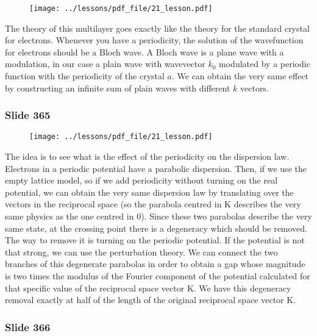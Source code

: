 \documentclass[../main/main.tex]{subfiles}
\begin{document}
\begin{figure}[h!]
\centering
\texttt{[image: ../lessons/pdf\_file/21\_lesson.pdf]}
\end{figure}

The theory of this multilayer goes exactly like the theory for the standard crystal for electrons. 
Whenever you have a periodicity, the solution of the wavefunction for electrons should be a Bloch wave. 
A Bloch wave is a plane wave with a modulation, in our case a plain wave with wavevector $k_0$ modulated by a periodic function with the periodicity of the crystal $a$. 
We can obtain the very same effect by constructing an infinite sum of plain waves with different $k$ vectors.


\newpage

\subsubsection{Slide 365}

\begin{figure}[h!]
\centering
\texttt{[image: ../lessons/pdf\_file/21\_lesson.pdf]}
\end{figure}

The idea is to see what is the effect of the periodicity on the dispersion law.
Electrons in a periodic potential have a parabolic dispersion. Then, if we use the empty lattice model, so if we add periodicity without turning on the real potential, we can obtain the very same dispersion law by translating over the vectors in the reciprocal space (so the parabola centred in K describes the very same physics as the one centred in 0).
Since these two parabolas describe the very same state, at the crossing point there is a degeneracy which should be removed.
The way to remove it is turning on the periodic potential. If the potential is not that strong, we can use the perturbation theory. We can connect the two branches of this degenerate parabolas in order to obtain a gap whose magnitude is two times the modulus of the Fourier component of the potential calculated for that specific value of the reciprocal space vector K.
We have this degeneracy removal exactly at half of the length of the original reciprocal space vector K.

\newpage

\subsubsection{Slide 366} 
\end{document}
